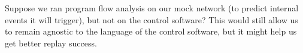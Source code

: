 Suppose we ran program flow analysis on our mock network (to predict internal
events it will trigger), but not on the control software? This would still
allow us to remain agnostic to the language of the control software, but it might help us get better replay success.
